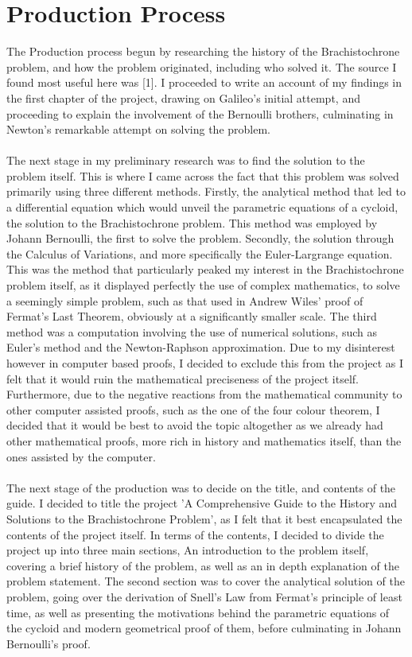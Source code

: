 \documentclass[12pt]{report}
\begin{document}
\chapter{Production Process}
The Production process begun by researching the history of the Brachistochrone problem, and how the problem originated, including who solved it. The source I found most useful here was [1]. I proceeded to write an account of my findings in the first chapter of the project, drawing on Galileo's initial attempt, and proceeding to explain the involvement of the Bernoulli brothers, culminating in Newton's remarkable attempt on solving the problem. 
\\
\\
The next stage in my preliminary research was to find the solution to the problem itself. This is where I came across the fact that this problem was solved primarily using three different methods. Firstly, the analytical method that led to a differential equation which would unveil the parametric equations of a cycloid, the solution to the Brachistochrone problem. This method was employed by Johann Bernoulli, the first to solve the problem. Secondly, the solution through the Calculus of Variations, and more specifically the Euler-Largrange equation. This was the method that particularly peaked my interest in the Brachistochrone problem itself, as it displayed perfectly the use of complex mathematics, to solve a seemingly simple problem, such as that used in Andrew Wiles' proof of Fermat's Last Theorem, obviously at a significantly smaller scale. The third method was a computation involving the use of numerical solutions, such as Euler's method and the Newton-Raphson approximation. Due to my disinterest however in computer based proofs, I decided to exclude this from the project as I felt that it would ruin the mathematical preciseness of the project itself. Furthermore, due to the negative reactions from the mathematical community to other computer assisted proofs, such as the one of the four colour theorem, I decided that it would be best to avoid the topic altogether as we already had other mathematical proofs, more rich in history and mathematics itself, than the ones assisted by the computer.
\\
\\
The next stage of the production was to decide on the title, and contents of the guide. I decided to title the project 'A Comprehensive Guide to the History and Solutions to the Brachistochrone Problem', as I felt that it best encapsulated the contents of the project itself. In terms of the contents, I decided to divide the project up into three main sections, An introduction to the problem itself, covering a brief history of the problem, as well as an in depth explanation of the problem statement. The second section was to cover the analytical solution of the problem, going over the derivation of Snell's Law from Fermat's principle of least time, as well as presenting the motivations behind the parametric equations of the cycloid and modern geometrical proof of them, before culminating in Johann Bernoulli's proof.
\end{document}
